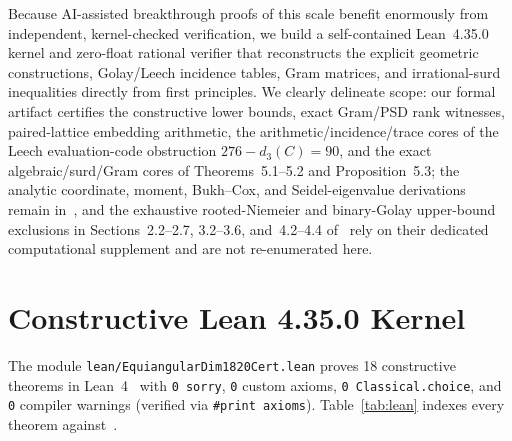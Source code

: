 \documentclass[10pt,twocolumn]{article}
\begin{document}
Because AI-assisted breakthrough proofs of this scale benefit enormously from independent, kernel-checked verification, we build a self-contained Lean~4.35.0 kernel and zero-float rational verifier that reconstructs the explicit geometric constructions, Golay/Leech incidence tables, Gram matrices, and irrational-surd inequalities directly from first principles. We clearly delineate scope: our formal artifact certifies the constructive lower bounds, exact Gram/PSD rank witnesses, paired-lattice embedding arithmetic, the arithmetic/incidence/trace cores of the Leech evaluation-code obstruction $276 - d_3(C) = 90$, and the exact algebraic/surd/Gram cores of Theorems~5.1--5.2 and Proposition~5.3; the analytic coordinate, moment, Bukh--Cox, and Seidel-eigenvalue derivations remain in~\cite{DLY2026}, and the exhaustive rooted-Niemeier and binary-Golay upper-bound exclusions in Sections~2.2--2.7, 3.2--3.6, and~4.2--4.4 of~\cite{DLY2026} rely on their dedicated computational supplement and are not re-enumerated here.

\section{Constructive Lean 4.35.0 Kernel}
The module \texttt{lean/EquiangularDim1820Cert.lean} proves 18 constructive theorems in Lean~4~\cite{Lean4} with \texttt{0 sorry}, \texttt{0} custom axioms, \texttt{0 Classical.choice}, and \texttt{0} compiler warnings (verified via \texttt{\#print axioms}). Table~\ref{tab:lean} indexes every theorem against~\cite{DLY2026}.
\end{document}
